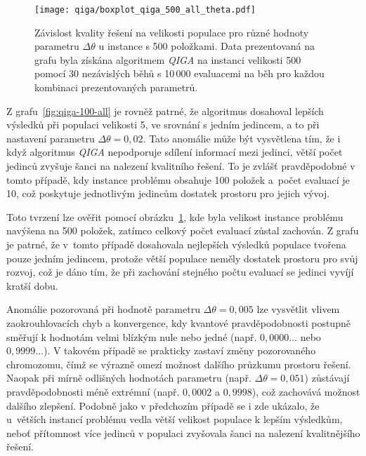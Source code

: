 \begin{figure}[ht!]
    \centering
    \texttt{[image: qiga/boxplot\_qiga\_500\_all\_theta.pdf]}
    \caption{Závislost kvality řešení na velikosti populace pro různé hodnoty parametru $\Delta\theta$ u instance s 500 položkami. Data prezentovaná na grafu byla získána algoritmem \emph{QIGA} na instanci velikosti 500 pomocí 30 nezávislých běhů s 10\,000 evaluacemi na běh pro každou kombinaci prezentovaných parametrů.}
    \label{fig:qiga-500-all}
\end{figure}

Z grafu~\ref{fig:qiga-100-all} je rovněž patrné, že algoritmus dosahoval lepších výsledků při populaci velikosti 5, ve srovnání s jedním jedincem, a to při nastavení parametru $\Delta\theta = 0{,}02$.  
Tato anomálie může být vysvětlena tím, že i když algoritmus \emph{QIGA} nepodporuje sdílení informací mezi jedinci, větší počet jedinců zvyšuje šanci na nalezení kvalitního řešení. 
To je zvlášť pravděpodobné v tomto případě, kdy instance problému obsahuje 100 položek a~počet evaluací je 10, což poskytuje jednotlivým jedincům dostatek prostoru pro jejich vývoj. 

Toto tvrzení lze ověřit pomocí obrázku~\ref{fig:qiga-500-all}, kde byla velikost instance problému navýšena na 500 položek, zatímco celkový počet evaluací zůstal zachován. 
Z grafu je patrné, že v~tomto případě dosahovala nejlepších výsledků populace tvořena pouze jedním jedincem, protože větší populace neměly dostatek prostoru pro svůj rozvoj, což je dáno tím, že při zachování stejného počtu evaluací se jedinci vyvíjí kratší dobu. 

Anomálie pozorovaná při hodnotě parametru $\Delta\theta = 0{,}005$ lze vysvětlit vlivem zaokrouhlovacích chyb a konvergence, kdy kvantové pravděpodobnosti postupně směřují k hodnotám velmi blízkým nule nebo jedné (např. $0{,}0000\dots$ nebo $0{,}9999\dots$). 
V takovém případě se prakticky zastaví změny pozorovaného chromozomu, čímž se výrazně omezí možnost dalšího průzkumu prostoru řešení.  
Naopak při mírně odlišných hodnotách parametru (např. $\Delta\theta = 0{,}051$) zůstávají pravděpodobnosti méně extrémní (např. $0{,}0002$ a $0{,}9998$), což zachovává možnost dalšího zlepšení. 
Podobně jako v předchozím případě se i zde ukázalo, že u~větších instancí problému vedla větší velikost populace k lepším výsledkům, neboť přítomnost více jedinců v populaci zvyšovala šanci na nalezení kvalitnějšího řešení.

